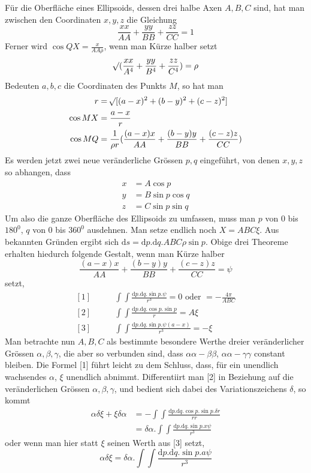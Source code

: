 Für die Oberfläche eines Ellipsoids, dessen drei halbe Axen $A,B,C$ sind, hat man zwischen den Coordinaten $x,y,z$ die Gleichung
\[
\frac{xx}{AA}+\frac{yy}{BB}+\frac{zz}{CC}=1
\]
Ferner wird $\cos QX=\frac{x}{AA\rho}$, wenn man Kürze halber setzt
\[
\mathord{{}^{}\!\surd}(\frac{xx}{A^4}+\frac{yy}{B^4}+\frac{zz}{C^4})=\rho
\]
Bedeuten $a,b,c$ die Coordinaten des Punkts $M$, so hat man
\[
\begin{aligned}
r&=\mathord{{}^{}\!\surd}[(a-x)^2+(b-y)^2+(c-z)^2]\\
\cos MX&=\frac{a-x}{r}\\
\cos MQ&=\frac{1}{\rho r}(\frac{(a-x)x}{AA}+\frac{(b-y)y}{BB}+\frac{(c-z)z}{CC})
\end{aligned}
\]
Es werden jetzt zwei neue veränderliche Grössen $p,q$ eingeführt, von denen $x,y,z$ so abhangen, dass
\[
\begin{aligned}
x&=A\cos p\\
y&=B\sin p\cos q\\
z&=C\sin p\sin q
\end{aligned}
\]
Um also die ganze Oberfläche des Ellipsoids zu umfassen, muss man $p$ von $0$ bis $180^0$, $q$ von $0$ bis $360^0$ ausdehnen. Man setze endlich noch $X=ABC\xi$. Aus bekannten Gründen ergibt sich $\mathrm{d}s=\mathrm{d}p.\mathrm{d}q.ABC\rho\sin p$. Obige drei Theoreme erhalten hiedurch folgende Gestalt, wenn man Kürze halber
\[
\frac{(a-x)x}{AA}+\frac{(b-y)y}{BB}+\frac{(c-z)z}{CC}=\psi
\]
setzt,
\[
\begin{aligned}
[1]\qquad &\int\int\frac{\mathrm{d}p.\mathrm{d}q.\sin p.\psi}{r^3}=0\text{ oder }=-\frac{4\pi}{ABC}\\
[2]\qquad &\int\int\frac{\mathrm{d}p.\mathrm{d}q.\cos p.\sin p}{r}=A\xi\\
[3]\qquad &\int\int\frac{\mathrm{d}p.\mathrm{d}q.\sin p.\psi(a-x)}{r^3}=-\xi
\end{aligned}
\]
Man betrachte nun $A,B,C$ als bestimmte besondere Werthe dreier veränderlicher Grössen $\alpha,\beta,\gamma$, die aber so verbunden sind, dass $\alpha\alpha-\beta\beta$, $\alpha\alpha-\gamma\gamma$ constant bleiben. Die Formel [1] führt leicht zu dem Schluss, dass, für ein unendlich wachsendes $\alpha$, $\xi$ unendlich abnimmt. Differentiirt man [2] in Beziehung auf die veränderlichen Grössen $\alpha,\beta,\gamma$, und bedient sich dabei des Variationszeichens $\delta$, so kommt
\[
\begin{aligned}
\alpha\delta\xi+\xi\delta\alpha&=-\int\int\frac{\mathrm{d}p.\mathrm{d}q.\cos p.\sin p.\delta r}{rr}\\
&=\delta\alpha.\int\int\frac{\mathrm{d}p.\mathrm{d}q.\sin p.x\psi}{r^3}
\end{aligned}
\]
oder wenn man hier statt $\xi$ seinen Werth aus [3] setzt,
\[
\alpha\delta\xi=\delta\alpha.\int\int\frac{\mathrm{d}p.\mathrm{d}q.\sin p.a\psi}{r^3}
\]

